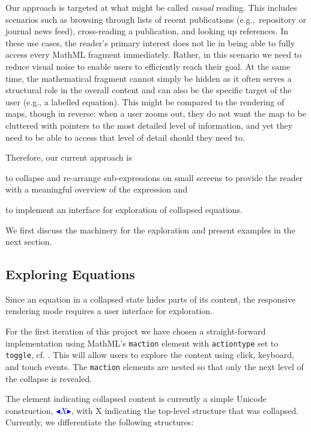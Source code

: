 \documentclass{llncs}
\def\collapse#1{\textcolor{blue}{\ensuremath{\mathord{\blacktriangleleft}\mathord{#1}
\mathord{\blacktriangleright}}}}
\begin{document}
Our approach is targeted at what might be called \emph{casual} reading. This 
includes scenarios such as browsing through lists of recent publications 
(e.g.,~repository or journal news feed), cross-reading a publication, and
looking up references. In these use cases, the reader's primary interest does 
not lie in being able to fully access every MathML fragment immediately. 
Rather, in this scenario we need to reduce visual noise to enable 
users to efficiently reach their goal. At the same time, the mathematical 
fragment cannot simply be hidden as it often serves a structural role in the 
overall content and can also be the specific target of the user (e.g., a labelled 
equation). This might be compared to the rendering of maps, though in reverse: 
when a user zooms out, they do not want the map to be cluttered with pointers to 
the most detailed level of information, and yet they need to be able to access 
that level of detail should they need to.


Therefore, our current approach is
\begin{inparaenum}[(a)]
\item to collapse and re-arrange sub-expressions on small screens to provide the
  reader with a meaningful overview of the expression and
\item to implement an interface for exploration of collapsed equations.
\end{inparaenum}
We first discuss the machinery for the exploration and present examples in the
next section.

\subsection{Exploring Equations}
\label{sec:animating}


Since an equation in a collapsed state hides parts of its content, the
responsive rendering mode requires a user interface for exploration.

For the first iteration of this project we have chosen a straight-forward
implementation using MathML's
\texttt{maction} element with \texttt{actiontype} set to \texttt{toggle}, cf. 
\cite[3.7.1]{MML}. This will
allow users to explore the content using click, keyboard, and touch events.
The \texttt{maction} elements are nested so that only the next level of the
collapse is revealed.

The element indicating collapsed content is currently a simple Unicode 
construction, \collapse{X}, with X indicating the top-level structure that was 
collapsed. Currently, we differentiate the following structures:
\end{document}
